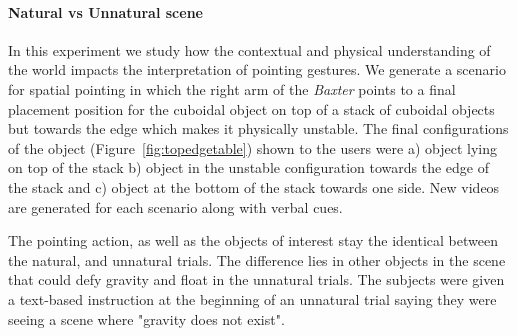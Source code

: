 \paragraph{Natural vs Unnatural scene}
In this experiment we study how the contextual and physical understanding of the world impacts the interpretation of pointing gestures. We generate a scenario for spatial pointing in which the right arm of the \textit{Baxter} points to a final placement position for the cuboidal object on top of a stack of cuboidal objects but towards the edge which makes it physically unstable. The final configurations of the object (Figure~\ref{fig:topedgetable}) shown to the users were a) object lying on top of the stack b) object in the unstable configuration towards the edge of the stack and c) object at the bottom of the stack towards one side. New videos are generated for each scenario along with verbal cues.

The pointing action, as well as the objects of interest stay the identical between the natural, and unnatural trials. The difference lies in other objects in the scene that could defy gravity and float in the unnatural trials. The subjects were given a text-based instruction at the beginning of an unnatural trial saying they were seeing a scene where "gravity does not exist". 








